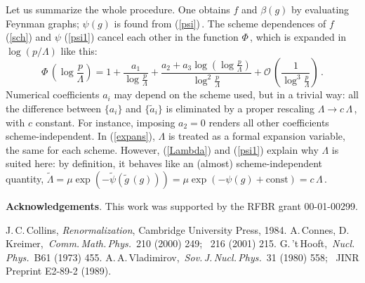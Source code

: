 \documentclass[a4paper,12pt]{article}
\begin{document}
Let us summarize the whole procedure. One obtains $f$ and $\beta(g)$ by
evaluating Feynman graphs;  $\psi(g)$ is found from (\ref{psi})\,.
The scheme dependences of $f$ (\ref{sch}) and $\psi$
(\ref{psi1}) cancel each other in the function $\Phi$\,,
which is expanded in $\log(p/\Lambda)$ like this:
\begin{equation}
\label{expans}
\Phi\,(\log\frac{p}{\Lambda}) = 1 + \frac{a_1}{\log\frac{p}{\Lambda}}
 + \frac{a_2 + a_3\log(\log\frac{p}{\Lambda})}{\log^2\frac{p}{\Lambda}}
 + \mathcal{O}\,(\frac{1}{\log^3\frac{p}{\Lambda}})\,.
\end{equation}
Numerical coefficients $a_i$ may depend on the scheme used, but in a trivial
way: all the difference between $\{a_i\}$ and $\{\tilde a_i\}$ is
eliminated by a proper rescaling
$\Lambda\rightarrow c\,\Lambda$\,, with $c$ constant.
For instance, imposing $a_2=0$ renders all other coefficients
scheme-independent. In (\ref{expans}), $\Lambda$ is treated as
a formal expansion variable, the same for each scheme. However,
(\ref{Lambda}) and (\ref{psi1}) explain why $\Lambda$ is suited here:
by definition, it behaves like an (almost) scheme-independent quantity,
$\tilde\Lambda=\mu\exp(-\tilde\psi(\tilde g\,(g)))
=\mu\exp(-\psi(g)+\text{const})=c\,\Lambda$\,.

\vspace{.5cm}

\noindent
{\small {\bf Acknowledgements}. This work was supported by the RFBR
grant 00-01-00299.}

\vspace{0cm}

\begin{thebibliography}{99}

 J.\,C.\,Collins, \emph{Renormalization}, Cambridge
University Press, 1984.
 A.\,Connes, D.\,Kreimer, \,\emph{Comm.\,Math.\,Phys.}\,
210 (2000) 249; \ 216 (2001) 215.
 G.\,'t\,Hooft, \,\emph{Nucl.\,Phys.}\, B61 (1973) 455.
 A.\,A.\,Vladimirov, \,\emph{Sov.\,J.\,Nucl.\,Phys.}\,
31 (1980) 558; \ JINR Preprint E2-89-2 (1989).

\end{thebibliography}
\end{document}
